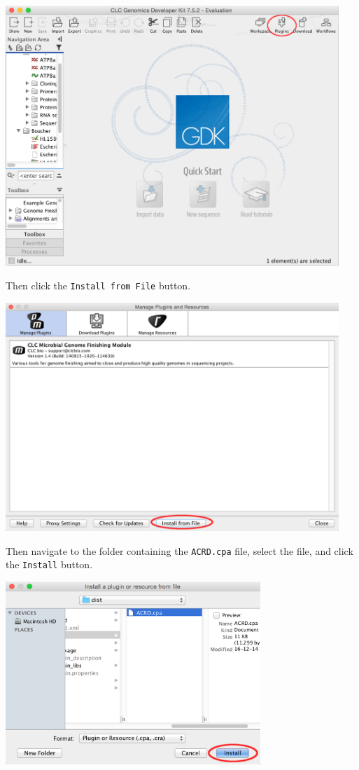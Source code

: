 \documentclass[12pt,letterpaper]{article}
\begin{document}
\begin{center}
    \includegraphics[width=34em]{plugins_button.png}
\end{center}

Then click the \texttt{Install from File} button.

\begin{center}
    \includegraphics[width=34em]{install_from_file_button.png}
\end{center}

Then navigate to the folder containing the \texttt{ACRD.cpa} file, select the
file, and click the \texttt{Install} button.

\begin{center}
    \includegraphics[width=26em]{install_button.png}
\end{center}
\end{document}
